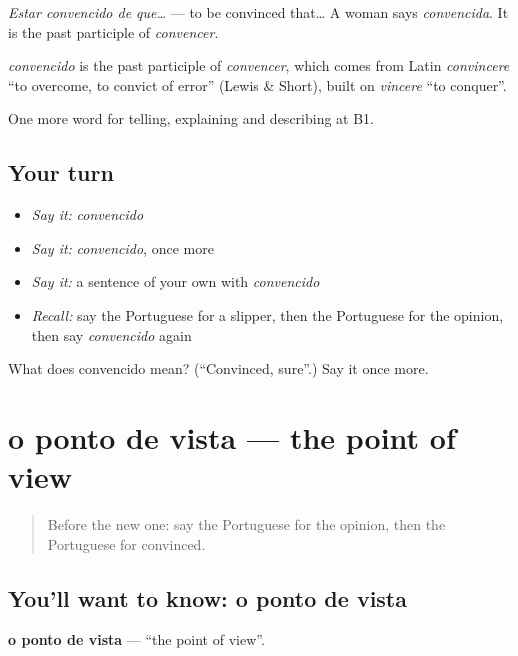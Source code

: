 \emph{Estar convencido de que…} — to be convinced that… A woman says \emph{convencida}. It is the past participle of \emph{convencer}.

\begin{cousinweb}
\emph{convencido} is the past participle of \emph{convencer}, which comes from Latin \emph{convincere} \textquotedblleft{}to overcome, to convict of error\textquotedblright{} (Lewis \& Short), built on \emph{vincere} \textquotedblleft{}to conquer\textquotedblright{}.
\end{cousinweb}

\begin{grammarlens}[title={What you've built}]
One more word for telling, explaining and describing at B1.
\end{grammarlens}

\subsection*{Your turn}
\begin{itemize}
\raggedright
  \item \emph{Say it:} \emph{convencido}
  \item \emph{Say it:} \emph{convencido}, once more
  \item \emph{Say it:} a sentence of your own with \emph{convencido}
  \item \emph{Recall:} say the Portuguese for a slipper, then the Portuguese for the opinion, then say \emph{convencido} again
\end{itemize}

\begin{tcolorbox}[breakable,colback=teal!4,colframe=teal!35!black,title={Before you move on}]
What does convencido mean? (\textquotedblleft{}Convinced, sure\textquotedblright{}.) Say it once more.
\end{tcolorbox}
\section[o ponto de vista]{o ponto de vista — the point of view}

\label{lesson:PT-C335-ponto-de-vista}



\begin{quote}
Before the new one: say the Portuguese for the opinion, then the Portuguese for convinced.
\end{quote}

\subsection*{You'll want to know: o ponto de vista}
\textbf{o ponto de vista} — \textquotedblleft{}the point of view\textquotedblright{}.

